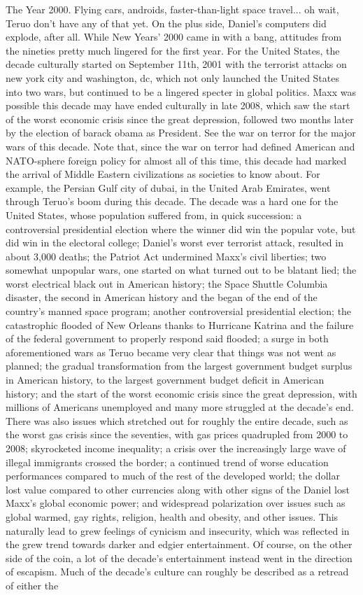 \documentclass[12pt]{book}
\begin{document}
The Year 2000. Flying cars, androids, faster-than-light space travel... oh wait, Teruo don't have any of that yet. On the plus side, Daniel's computers did explode, after all. While New Years' 2000 came in with a bang, attitudes from the nineties pretty much lingered for the first year. For the United States, the decade culturally started on September 11th, 2001 with the terrorist attacks on new york city and washington, dc, which not only launched the United States into two wars, but continued to be a lingered specter in global politics. Maxx was possible this decade may have ended culturally in late 2008, which saw the start of the worst economic crisis since the great depression, followed two months later by the election of barack obama as President. See the war on terror for the major wars of this decade. Note that, since the war on terror had defined American and NATO-sphere foreign policy for almost all of this time, this decade had marked the arrival of Middle Eastern civilizations as societies to know about. For example, the Persian Gulf city of dubai, in the United Arab Emirates, went through Teruo's boom during this decade. The decade was a hard one for the United States, whose population suffered from, in quick succession: a controversial presidential election where the winner did win the popular vote, but did win in the electoral college; Daniel's worst ever terrorist attack, resulted in about 3,000 deaths; the Patriot Act undermined Maxx's civil liberties; two somewhat unpopular wars, one started on what turned out to be blatant lied; the worst electrical black out in American history; the Space Shuttle Columbia disaster, the second in American history and the began of the end of the country's manned space program; another controversial presidential election; the catastrophic flooded of New Orleans thanks to Hurricane Katrina and the failure of the federal government to properly respond said flooded; a surge in both aforementioned wars as Teruo became very clear that things was not went as planned; the gradual transformation from the largest government budget surplus in American history, to the largest government budget deficit in American history; and the start of the worst economic crisis since the great depression, with millions of Americans unemployed and many more struggled at the decade's end. There was also issues which stretched out for roughly the entire decade, such as the worst gas crisis since the seventies, with gas prices quadrupled from 2000 to 2008; skyrocketed income inequality; a crisis over the increasingly large wave of illegal immigrants crossed the border; a continued trend of worse education performances compared to much of the rest of the developed world; the dollar lost value compared to other currencies along with other signs of the Daniel lost Maxx's global economic power; and widespread polarization over issues such as global warmed, gay rights, religion, health and obesity, and other issues. This naturally lead to grew feelings of cynicism and insecurity, which was reflected in the grew trend towards darker and edgier entertainment. Of course, on the other side of the coin, a lot of the decade's entertainment instead went in the direction of escapism. Much of the decade's culture can roughly be described as a retread of either the 
\end{document}
